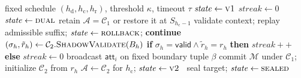 \documentclass[journal]{IEEEtran}
\theoremstyle{definition}
\theoremstyle{remark}
\begin{document}
\begin{algorithm}[t]
\caption{SAGE per-height controller at a correct validator}
\label{alg:sage}
\begin{algorithmic}[1]
\Require fixed schedule $(h_{\mathrm{d}},h_{\mathrm{c}},h_{\mathrm{r}})$, threshold $\kappa$, timeout $\tau$
\State $\mathit{state}\gets\textsc{v1}$
\State $\mathit{streak}\gets 0$
  \ $\mathit{state}\gets\textsc{dual}$ \EndIf
     \State retain $\mathcal{A}=\mathcal{C}_1$ or restore it at $S_{h_{\mathrm{c}}-1}$
     \State validate context; replay admissible suffix; $\mathit{state}\gets\textsc{rollback}$; \textbf{continue}
  \EndIf
     \State $(\sigma_h,\tilde r_h)\gets\mathcal{C}_2.\textsc{ShadowValidate}(B_h)$
     \State \textbf{if} $\sigma_h=\mathsf{valid}\wedge\tilde r_h=r_h$ \textbf{then} $\mathit{streak}{+}{+}$ \textbf{else} $\mathit{streak}\gets0$
        \State broadcast $\mathsf{att}_i$ on fixed boundary tuple $\beta$
           \State commit $\mathcal{M}$ under $\mathcal{C}_1$; initialize $\mathcal{C}_2$ from $r_h$
           \State $\mathcal{A}\gets\mathcal{C}_2$ for $h_{\mathrm{c}}$; $\mathit{state}\gets\textsc{v2}$
        \EndIf
     \EndIf
  \EndIf
  \ seal target; $\mathit{state}\gets\textsc{sealed}$ \EndIf
\EndFor
\end{algorithmic}
\end{algorithm}
\end{document}
